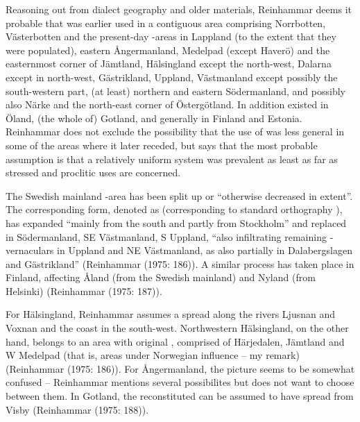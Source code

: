 Reasoning out from dialect geography and older materials, Reinhammar deems it probable that  was earlier used in a contiguous area comprising Norrbotten, Västerbotten and the present-day -areas in Lappland (to the extent that they were populated), eastern Ångermanland, Medelpad (except Haverö) and the easternmost corner of Jämtland, Hälsingland except the north-west, Dalarna except in north-west, Gästrikland, Uppland, Västmanland except possibly the south-western part, (at least) northern and eastern Södermanland, and possibly also Närke and the north-east corner of Östergötland. In addition  existed in Öland, (the whole of) Gotland, and generally in Finland and Estonia. Reinhammar does not exclude the possibility that the use of  was less general in some of the areas where it later receded, but says that the most probable assumption is that a relatively uniform system was prevalent as least as far as stressed and proclitic uses are concerned.

The Swedish mainland -area has been split up or “otherwise decreased in extent”. The corresponding form, denoted as  (corresponding to standard orthography ), has expanded “mainly from the south and partly from Stockholm” and replaced  in Södermanland, SE Västmanland, S Uppland, “also infiltrating remaining -vernaculars in Uppland and NE Västmanland, as also partially in Dalabergslagen and Gästrikland” (Reinhammar (1975: 186)). A similar process has taken place in Finland, affecting Åland (from the Swedish mainland) and Nyland (from Helsinki) (Reinhammar (1975: 187)).

For Hälsingland, Reinhammar assumes a spread along the rivers Ljusnan and Voxnan and the coast in the south-west. Northwestern Hälsingland, on the other hand, belongs to an area with original , comprised of Härjedalen, Jämtland and W Medelpad (that is, areas under Norwegian influence – my remark) (Reinhammar (1975: 186)). For Ångermanland, the picture seems to be somewhat confused – Reinhammar mentions several possibilites but does not want to choose between them. In Gotland, the reconstituted  can be assumed to have spread from Visby (Reinhammar (1975: 188)). 

